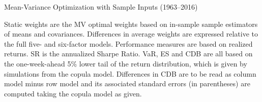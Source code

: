 
\begin{table}
  \centering
  \footnotesize
  \renewcommand{\arraystretch}{1.2}

  \caption{Mean-Variance Optimization with Sample Inputs (1963--2016)}

  \begin{longcaption}
    Static weights are the MV optimal weights based on in-sample sample estimators of means and covariances. Differences in average weights are expressed relative to the full five- and six-factor models. Performance measures are based on realized returns. SR is the annualized Sharpe Ratio. VaR, ES and CDB are all based on the one-week-ahead 5\% lower tail of the return distribution, which is given by simulations from the copula model. Differences in CDB are to be read as column model minus row model and its associated standard errors (in parentheses) are computed taking the copula model as given.
  \end{longcaption}

  \label{tab:mw_mv_sample}


\end{table}
